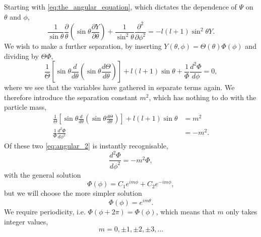Starting with \autoref{eq:the_angular_equation}, which dictates the dependence of
$\Psi$ on $\theta$ and $\phi$,
\begin{equation}
    \frac{1}{\sin\theta}\frac{\partial}{\theta} 
        \left(\sin\theta\frac{\partial Y}{\partial \theta} \right)
    +
    \frac{1}{\sin^2\theta} \frac{\partial^2}{\partial\phi^2}
    =
    -l(l + 1)\sin^2\theta Y.
\end{equation}
We wish to make a further separation, by inserting
$Y(\theta, \phi) = \Theta(\theta)\Phi(\phi)$ and dividing by $\Theta\Phi$,
\begin{equation}
    \frac{1}{\Theta}
    \left[
        \sin\theta \frac{d}{d\theta}
            \left(\sin\theta \frac{d\Theta}{d\theta} \right)
    \right]
    + l(l + 1) \sin\theta 
    +
    \frac{1}{\Phi} \frac{d^2\Phi}{d\phi} = 0,
\end{equation}
where we see that the variables have gathered in separate terms again. We therefore 
introduce the separation constant $m^2$, which has nothing to do with the particle mass,
\begin{align}
    \label{eq:angular_1}
    \frac{1}{\Theta}
    \left[
        \sin\theta \frac{d}{d\theta}
            \left(\sin\theta \frac{d\Theta}{d\theta} \right)
    \right]
    + l(l + 1)\sin\theta &= m^2 \\
    \label{eq:angular_2}
    \frac{1}{\Phi}\frac{d^2\Phi}{d\phi^2} &= -m^2.
\end{align}
Of these two \autoref{eq:angular_2} is instantly recognisable,
\begin{equation}
    \frac{d^2\Phi}{d\phi^2} = -m^2\Phi,
\end{equation}
with the general solution
\begin{equation}
    \Phi(\phi) = C_1e^{im\phi} + C_2 e^{-im\phi},
\end{equation}
but we will choose the more simpler solution 
\begin{equation}
    \Phi(\phi) = e^{im\theta}.
\end{equation}
We require periodicity, i.e. $\Phi(\phi + 2\pi) = \Phi(\phi)$, which means that 
$m$ only takes integer values,
\begin{equation*}
    m = 0, \pm 1, \pm 2, \pm 3, \dots
\end{equation*}


